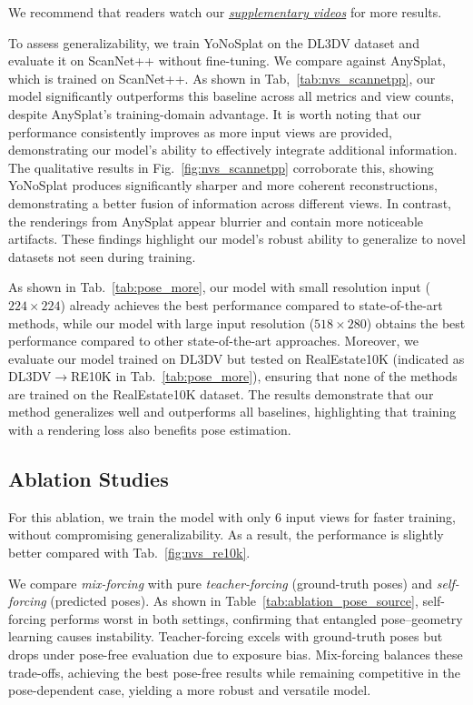 We recommend that readers watch our \textit{\underline{supplementary videos}} for more results.

To assess generalizability, we train YoNoSplat on the DL3DV dataset and evaluate it on ScanNet++ without fine-tuning. We compare against AnySplat, which is trained on ScanNet++. As shown in Tab,~\ref{tab:nvs_scannetpp}, our model significantly outperforms this baseline across all metrics and view counts, despite AnySplat's training-domain advantage. 
It is worth noting that our performance consistently improves as more input views are provided, demonstrating our model's ability to effectively integrate additional information.
The qualitative results in Fig.~\ref{fig:nvs_scannetpp} corroborate this, showing YoNoSplat produces significantly sharper and more coherent reconstructions, demonstrating a better fusion of information across different views. In contrast, the renderings from AnySplat appear blurrier and contain more noticeable artifacts. 
These findings highlight our model's robust ability to generalize to novel datasets not seen during training.


As shown in Tab.~\ref{tab:pose_more}, our model with small resolution input ($224\times 224$) already achieves the best performance compared to state-of-the-art methods, while our model with large input resolution ($518\times 280$) obtains the best performance compared to other state-of-the-art approaches. Moreover, we evaluate our model trained on DL3DV but tested on RealEstate10K (indicated as DL3DV$\rightarrow$RE10K in Tab.~\ref{tab:pose_more}), ensuring that none of the methods are trained on the RealEstate10K dataset. The results demonstrate that our method generalizes well and outperforms all baselines, highlighting that training with a rendering loss also benefits pose estimation.

\vspace{-1mm}
\subsection{Ablation Studies}
\vspace{-2mm}
For this ablation, we train the model with only 6 input views for faster training, without compromising generalizability. As a result, the performance is slightly better compared with Tab.~\ref{fig:nvs_re10k}.

We compare \emph{mix-forcing} with pure \emph{teacher-forcing} (ground-truth poses) and \emph{self-forcing} (predicted poses). As shown in Table~\ref{tab:ablation_pose_source}, self-forcing performs worst in both settings, confirming that entangled pose–geometry learning causes instability. Teacher-forcing excels with ground-truth poses but drops under pose-free evaluation due to exposure bias. Mix-forcing balances these trade-offs, achieving the best pose-free results while remaining competitive in the pose-dependent case, yielding a more robust and versatile model.





